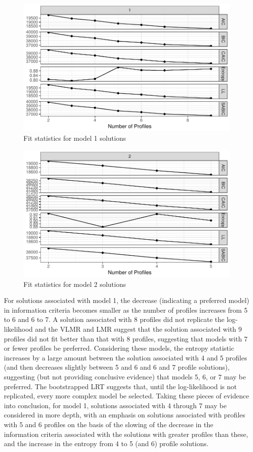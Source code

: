 \documentclass[]{msu-thesis}
\theoremstyle{definition}
\theoremstyle{definition}
\theoremstyle{definition}
\theoremstyle{remark}
\begin{document}
\begin{figure}

{\centering \includegraphics[width=0.5\linewidth]{rosenberg-dissertation_files/figure-latex/model1-1} 

}

\caption{Fit statistics for model 1 solutions}\label{fig:model1}
\end{figure}

\begin{figure}

{\centering \includegraphics[width=0.4\linewidth]{rosenberg-dissertation_files/figure-latex/model2-1} 

}

\caption{Fit statistics for model 2 solutions}\label{fig:model2}
\end{figure}

For solutions associated with model 1, the decrease (indicating a
preferred model) in information criteria becomes smaller as the number
of profiles increases from 5 to 6 and 6 to 7. A solution associated with
8 profiles did not replicate the log-likelihood and the VLMR and LMR
suggest that the solution associated with 9 profiles did not fit better
than that with 8 profiles, suggesting that models with 7 or fewer
profiles be preferred. Considering these models, the entropy statistic
increases by a large amount between the solution associated with 4 and 5
profiles (and then decreases slightly between 5 and 6 and 6 and 7
profile solutions), suggesting (but not providing conclusive evidence)
that models 5, 6, or 7 may be preferred. The bootstrapped LRT suggests
that, until the log-likelihood is not replicated, every more complex
model be selected. Taking these pieces of evidence into conclusion, for
model 1, solutions associated with 4 through 7 may be considered in more
depth, with an emphasis on solutions associated with profiles with 5 and
6 profiles on the basis of the slowing of the decrease in the
information criteria associated with the solutions with greater profiles
than these, and the increase in the entropy from 4 to 5 (and 6) profile
solutions.
\end{document}
